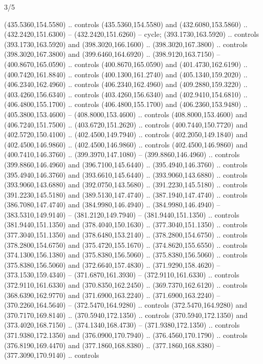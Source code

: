 \begin{flagdescription}{3/5}
\begin{scope}[shift={(0.5\flaglength,0.5\flagwidth)},scale=\flagwidth/510]
\begin{scope}[y=0.80pt, x=0.80pt, yscale=-1.06, xscale=1.06,yshift=-240pt,xshift=-400pt]
\begin{scope}[cm={{0.83333,0.0,0.0,0.83333,(154.64672,48.64761)}}]
\begin{scope}[cm={{0.93334,0.0,0.0,0.93334,(-4.86471,22.64035)}}]
\begin{scope}[line width=0.489\lw]
\begin{scope}[draw=c003300,fill=c338a00]
  (435.5360,154.5580) .. controls (435.5360,154.5580) and (432.6080,153.5860) ..
  (432.2420,151.6300) -- (432.2420,151.6260) -- cycle;
 (393.1730,163.5920) .. controls (393.1730,163.5920) and
  (398.3020,166.1600) .. (398.3020,167.3800) .. controls (398.3020,167.3800) and
  (399.6460,164.6920) .. (398.9120,163.7150) -- (400.8670,165.0590) .. controls
  (400.8670,165.0590) and (401.4730,162.6190) .. (400.7420,161.8840) .. controls
  (400.1300,161.2740) and (405.1340,159.2020) .. (406.2340,162.4960) .. controls
  (406.2340,162.4960) and (409.2880,159.3220) .. (403.4260,156.6340) .. controls
  (403.4260,156.6340) and (402.9410,154.6810) .. (406.4800,155.1700) .. controls
  (406.4800,155.1700) and (406.2360,153.9480) .. (405.3800,153.4600) --
  (408.8000,153.4600) .. controls (408.8000,153.4600) and (406.7240,151.7500) ..
  (403.6720,151.2620) .. controls (400.7440,150.7720) and (402.5720,150.4100) ..
  (402.4500,149.7940) .. controls (402.2050,149.1840) and (402.4500,146.9860) ..
  (402.4500,146.9860) .. controls (402.4500,146.9860) and (400.7410,146.3760) ..
  (399.3970,147.1080) -- (399.8860,146.4960) .. controls (399.8860,146.4960) and
  (396.7100,145.6440) .. (395.4940,146.3760) .. controls (395.4940,146.3760) and
  (393.6610,145.6440) .. (393.9060,143.6880) .. controls (393.9060,143.6880) and
  (392.0750,143.5680) .. (391.2230,145.5180) .. controls (391.2230,145.5180) and
  (389.5130,147.4740) .. (387.1940,147.4740) .. controls (386.7080,147.4740) and
  (384.9980,146.4940) .. (384.9980,146.4940) -- (383.5310,149.9140) --
  (381.2120,149.7940) -- (381.9440,151.1350) .. controls (381.9440,151.1350) and
  (378.4040,150.1630) .. (377.3040,151.1350) .. controls (377.3040,151.1350) and
  (378.6480,153.2140) .. (378.2800,154.6750) .. controls (378.2800,154.6750) and
  (375.4720,155.1670) .. (374.8620,155.6550) .. controls (374.1300,156.1380) and
  (375.8380,156.5060) .. (375.8380,156.5060) .. controls (375.8380,156.5060) and
  (372.6640,157.4830) .. (371.9290,158.4620) -- (373.1530,159.4340) --
  (371.6870,161.3930) -- (372.9110,161.6330) .. controls (372.9110,161.6330) and
  (370.8350,162.2450) .. (369.7370,162.6120) .. controls (368.6390,162.9770) and
  (371.6900,163.2240) .. (371.6900,163.2240) -- (370.2260,164.5640) --
  (372.5470,164.9280) .. controls (372.5470,164.9280) and (370.7170,169.8140) ..
  (370.5940,172.1350) .. controls (370.5940,172.1350) and (373.4020,168.7150) ..
  (374.1340,168.4730) -- (371.9380,172.1350) .. controls (371.9380,172.1350) and
  (376.0900,170.7940) .. (376.4560,170.1790) .. controls (376.8190,169.4470) and
  (377.1860,168.8380) .. (377.1860,168.8380) -- (377.3090,170.9140) .. controls

\end{scope}
\end{scope}
\end{scope}
\end{scope}
\end{scope}
\end{scope}
\end{flagdescription}
